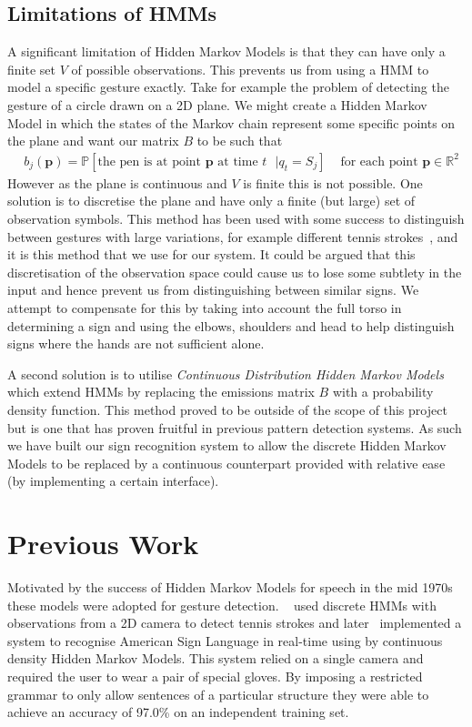 \subsection{Limitations of HMMs}
A significant limitation of Hidden Markov Models is that they can have only a finite set $V$ of possible observations. This prevents us from using a HMM to model a specific gesture exactly. Take for example the problem of detecting the gesture of a circle drawn on a 2D plane. We might create a Hidden Markov Model in which the states of the Markov chain represent some specific points on the plane and want our matrix $B$ to be such that
\begin{align*}
&b_j(\bm{p}) = \mathbb{P}[\text{the pen is at point $\bm{p}$ at time $t$ } | q_t = S_j] &\text{ for each point $\bm{p}\in\mathbb{R}^2$}
\end{align*}
However as the plane is continuous and $V$ is finite this is not possible. One solution is to discretise the plane and have only a finite (but large) set of observation symbols. This method has been used with some success to distinguish between gestures with large variations, for example different tennis strokes~\citep{yamato1992recognizing}, and it is this method that we use for our system. It could be argued that this discretisation of the observation space could cause us to lose some subtlety in the input and hence prevent us from distinguishing between similar signs. We attempt to compensate for this by taking into account the full torso in determining a sign and using the elbows, shoulders and head to help distinguish signs where the hands are not sufficient alone.

A second solution is to utilise \emph{Continuous Distribution Hidden Markov Models} which extend HMMs by replacing the emissions matrix $B$ with a probability density function. This method proved to be outside of the scope of this project but is one that has proven fruitful in previous pattern detection systems. As such we have built our sign recognition system to allow the discrete Hidden Markov Models to be replaced by a continuous counterpart provided with relative ease (by implementing a certain interface).

\section{Previous Work}
Motivated by the success of Hidden Markov Models for speech in the mid 1970s \citep{baker1975dragon, jelinek1975design} these models were adopted for gesture detection. ~\citet{yamato1992recognizing} used discrete HMMs with observations from a 2D camera to detect tennis strokes and later~\citet{starner1995real} implemented a system to recognise American Sign Language in real-time using by continuous density Hidden Markov Models. This system relied on a single camera and required the user to wear a pair of special gloves. By imposing a restricted grammar to only allow sentences of a particular structure they were able to achieve an accuracy of 97.0\% on an independent training set. 

